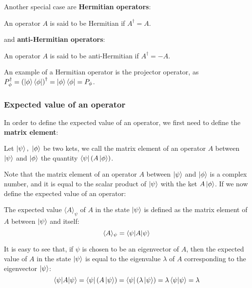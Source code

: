 Another special case are \textbf{Hermitian operators}:

\begin{definition}
    An operator $A$ is said to be Hermitian if $A^\dagger = A$.
\end{definition}

and \textbf{anti-Hermitian operators}:
\begin{definition}
    An operator $A$ is said to be anti-Hermitian if $A^\dagger = -A$.
\end{definition}

An example of a Hermitian operator is the projector operator, as $P_\phi^\dagger = \left(\ket{\phi}\bra{\phi}\right)^\dagger = \ket{\phi}\bra{\phi} = P_\phi$.

\subsubsection{Expected value of an operator}

In order to define the expected value of an operator, we first need to define the \textbf{matrix element}:

\begin{definition}
    Let $\ket{\psi}, \ \ket{\phi}$ be two kets, we call the matrix element of an operator $A$ between $\ket{\psi}$ and $\ket{\phi}$ the quantity $\bra{\psi}(A\ket{\phi})$. 
\end{definition}

Note that the matrix element of an operator $A$ between $\ket{\psi}$ and $\ket{\phi}$ is a complex number, and it is equal to the scalar product of $\ket{\psi}$ with the ket $A\ket{\phi}$. If we now define the expected value of an operator:

\begin{definition}
    The expected value $\langle A \rangle_\psi$ of $A$ in the state $\ket{\psi}$ is defined as the matrix element of $A$ between $\ket{\psi}$ and itself:
    \begin{equation}
        \langle A \rangle_\psi = \braket{\psi|A|\psi}
    \end{equation}
\end{definition}

It is easy to see that, if $\psi$ is chosen to be an eigenvector of $A$, then the expected value of $A$ in the state $\ket{\psi}$ is equal to the eigenvalue $\lambda$ of $A$ corresponding to the eigenvector $\ket{\psi}$:
\begin{equation}
    \braket{\psi|A|\psi} = \bra{\psi} (A \ket{\psi}) = \bra{\psi} (\lambda \ket{\psi}) = \lambda\braket{\psi|\psi} = \lambda
\end{equation}

